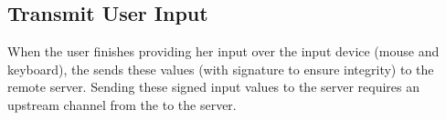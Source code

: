 

 

\subsection{Transmit User Input}
\label{sec:systemDesign:commit}

When the user finishes providing her input over the input device (mouse and keyboard), the \device sends these values (with signature to ensure integrity) to the remote server. Sending these signed input values to the server requires an upstream channel from the \device to the server.

